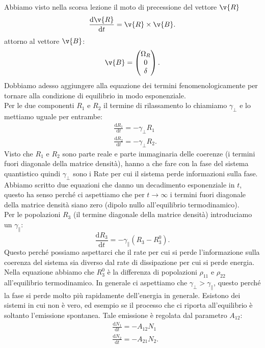Abbiamo visto nella scorsa lezione il moto di precessione del vettore $\v{R}$
\[
    \frac{\text{d} \v{R}}{\text{d} t} = \v{R}\times \v{B}
.\] 
attorno al vettore $\v{B}$:
\[
\v{B}=\begin{pmatrix} \Omega_R \\ 0 \\ \delta \end{pmatrix}
.\] 
Dobbiamo adesso aggiungere alla equazione dei termini fenomenologicamente per tornare alla condizione di equilibrio in modo esponenziale.\\
Per le due componenti $R_1$ e $R_2$ il termine di rilassamento lo chiamiamo $\gamma_{\perp}$ e lo mettiamo uguale per entrambe:
\[\begin{aligned}
    &\frac{\text{d} R_1}{\text{d} t} = -\gamma_\perp R_1\\
    &\frac{\text{d} R_2}{\text{d} t} = -\gamma_{\perp}R_2
.\end{aligned}\]
Visto che $R_1$  e $R_2$  sono parte reale e parte immaginaria delle coerenze (i termini fuori diagonale della matrice densità), hanno a che fare con la fase del sistema quantistico quindi $\gamma_\perp$ sono i Rate per cui il sistema perde informazioni sulla fase. \\
Abbiamo scritto due equazioni che danno un decadimento esponenziale in $t$, questo ha senso perché ci aspettiamo che per $t\to \infty$  i termini fuori diagonale della matrice densità siano zero (dipolo nullo all'equilibrio termodinamico).\\
Per le popolazioni $R_3$  (il termine diagonale della matrice densità) introduciamo un $\gamma_{\parallel}$:
\[
    \frac{\text{d} R_3}{\text{d} t} =-\gamma_\parallel \left(R_3-R_3^0\right)
.\] 
Questo perché possiamo aspettarci che il rate per cui si perde l'informazione sulla coerenza del sistema sia diverso dal rate di dissipazione per cui si perde energia. \\
Nella equazione abbiamo che $R_3^0$ è la differenza di popolazioni $\rho_{11}$  e $\rho_{22}$  all'equilibrio termodinamico.
In generale ci aspettiamo che $\gamma_{\perp}>\gamma_\parallel$, questo perché la fase si perde molto più rapidamente dell'energia in generale. Esistono dei sistemi in cui non è vero, ed esempio se il processo che ci  riporta all'equilibrio è soltanto l'emissione spontanea. Tale emissione è regolata dal parametro $A_{12}$:
\[\begin{aligned}
&\frac{\text{d} N_1}{\text{d} t} = -A_{12}N_1\\
&\frac{\text{d} N_2}{\text{d} t} = -A_{21}N_2	
.\end{aligned}\]
